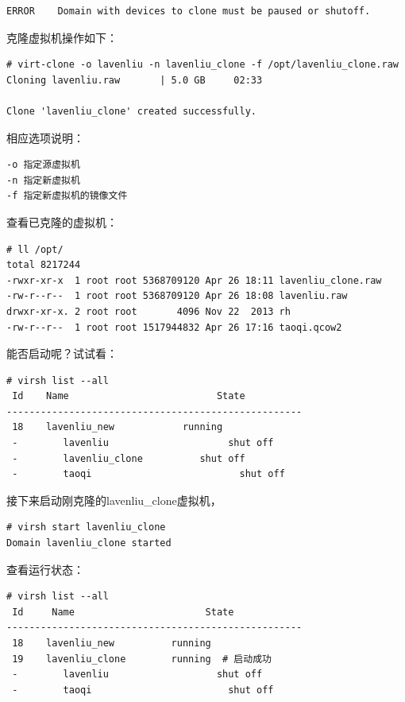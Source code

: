 \begin{verbatim}
ERROR    Domain with devices to clone must be paused or shutoff.
\end{verbatim}

克隆虚拟机操作如下：

\begin{verbatim}
# virt-clone -o lavenliu -n lavenliu_clone -f /opt/lavenliu_clone.raw
Cloning lavenliu.raw       | 5.0 GB     02:33     

Clone 'lavenliu_clone' created successfully.
\end{verbatim}

相应选项说明：

\begin{verbatim}
-o 指定源虚拟机
-n 指定新虚拟机
-f 指定新虚拟机的镜像文件
\end{verbatim}

查看已克隆的虚拟机：

\begin{verbatim}
# ll /opt/
total 8217244
-rwxr-xr-x  1 root root 5368709120 Apr 26 18:11 lavenliu_clone.raw
-rw-r--r--  1 root root 5368709120 Apr 26 18:08 lavenliu.raw
drwxr-xr-x. 2 root root       4096 Nov 22  2013 rh
-rw-r--r--  1 root root 1517944832 Apr 26 17:16 taoqi.qcow2
\end{verbatim}

能否启动呢？试试看：

\begin{verbatim}
# virsh list --all
 Id    Name                          State
----------------------------------------------------
 18    lavenliu_new            running
 -        lavenliu                     shut off
 -        lavenliu_clone          shut off
 -        taoqi                          shut off
\end{verbatim}

接下来启动刚克隆的lavenliu\_clone虚拟机，

\begin{verbatim}
# virsh start lavenliu_clone
Domain lavenliu_clone started
\end{verbatim}

查看运行状态：

\begin{verbatim}
# virsh list --all
 Id     Name                       State
----------------------------------------------------
 18    lavenliu_new          running
 19    lavenliu_clone        running  # 启动成功
 -        lavenliu                   shut off
 -        taoqi                        shut off
\end{verbatim}




